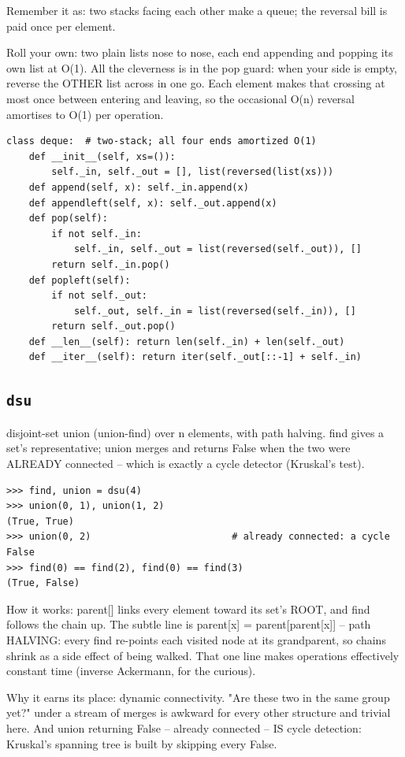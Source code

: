\documentclass[10pt,letterpaper]{book}
\begin{document}
Remember it as: two stacks facing each other make a queue; the reversal bill is paid once per element.


Roll your own: two plain lists nose to nose, each end appending and popping its own list at O(1). All the cleverness is in the pop guard: when your side is empty, reverse the OTHER list across in one go. Each element makes that crossing at most once between entering and leaving, so the occasional O(n) reversal amortises to O(1) per operation.

\begin{lstlisting}[style=ex]
class deque:  # two-stack; all four ends amortized O(1)
    def __init__(self, xs=()):
        self._in, self._out = [], list(reversed(list(xs)))
    def append(self, x): self._in.append(x)
    def appendleft(self, x): self._out.append(x)
    def pop(self):
        if not self._in:
            self._in, self._out = list(reversed(self._out)), []
        return self._in.pop()
    def popleft(self):
        if not self._out:
            self._out, self._in = list(reversed(self._in)), []
        return self._out.pop()
    def __len__(self): return len(self._in) + len(self._out)
    def __iter__(self): return iter(self._out[::-1] + self._in)
\end{lstlisting}
\subsection{\texttt{dsu}}\label{def:dsu}
disjoint-set union (union-find) over n elements, with path halving. find gives a set's representative; union merges and returns False when the two were ALREADY connected -- which is exactly a cycle detector (Kruskal's test).
\begin{lstlisting}[style=ex]
>>> find, union = dsu(4)
>>> union(0, 1), union(1, 2)
(True, True)
>>> union(0, 2)                         # already connected: a cycle
False
>>> find(0) == find(2), find(0) == find(3)
(True, False)
\end{lstlisting}

How it works: parent[] links every element toward its set's ROOT, and find follows the chain up. The subtle line is parent[x] = parent[parent[x]] -- path HALVING: every find re-points each visited node at its grandparent, so chains shrink as a side effect of being walked. That one line makes operations effectively constant time (inverse Ackermann, for the curious).


Why it earns its place: dynamic connectivity. "Are these two in the same group yet?" under a stream of merges is awkward for every other structure and trivial here. And union returning False -- already connected -- IS cycle detection: Kruskal's spanning tree is built by skipping every False.
\end{document}
